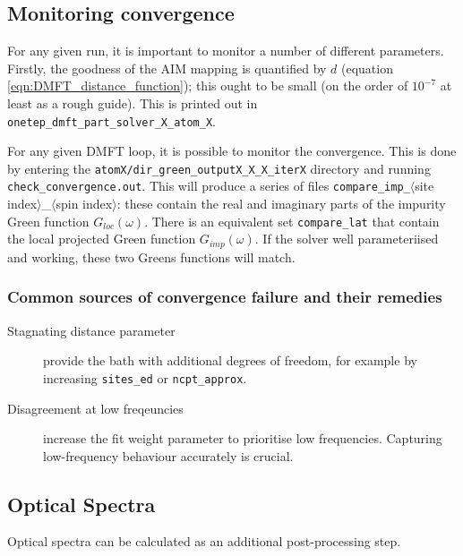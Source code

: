 \documentclass[10pt,a4paper,final]{article}
\begin{document}
\subsection{Monitoring convergence}
For any given run, it is important to monitor a number of different parameters. Firstly, the goodness of the AIM mapping is quantified by $d$ (equation \ref{eqn:DMFT_distance_function}); this ought to be small (on the order of $10^{-7}$ at least as a rough guide). This is printed out in \texttt{onetep\_dmft\_part\_solver\_X\_atom\_X}.

For any given DMFT loop, it is possible to monitor the convergence. This is done by entering the
\texttt{atomX/dir\_green\_outputX\_X\_X\_iterX} directory and running \texttt{check\_convergence.out}. This will produce a series of files \texttt{compare\_imp\_}$\langle$site index$\rangle$\_$\langle$spin index$\rangle$: these contain the real and imaginary parts of the impurity Green function $G_{loc}(\omega)$. There is an equivalent set \texttt{compare\_lat} that contain the local projected Green function $G_{imp}(\omega)$. If the solver well parameteriised and working, these two Greens functions will match.

\subsubsection{Common sources of convergence failure and their remedies}
\begin{description}
\item[Stagnating distance parameter] provide the bath with additional degrees of freedom, for example by increasing \texttt{sites\_ed} or \texttt{ncpt\_approx}.
\item[Disagreement at low freqeuncies] increase the fit weight parameter to prioritise low frequencies. Capturing low-frequency behaviour accurately is crucial.
\end{description}

\subsection{Optical Spectra}
Optical spectra can be calculated as an additional post-processing step.
\end{document}

